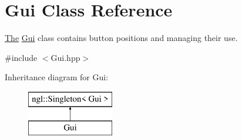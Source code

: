 \hypertarget{class_gui}{}\section{Gui Class Reference}
\label{class_gui}


\hyperlink{namespace_the}{The} \hyperlink{class_gui}{Gui} class contains button positions and managing their use.  




{\ttfamily \#include $<$Gui.\+hpp$>$}

Inheritance diagram for Gui\+:\begin{figure}[H]
\begin{center}
\leavevmode
\includegraphics[height=2.000000cm]{class_gui}
\end{center}
\end{figure}
